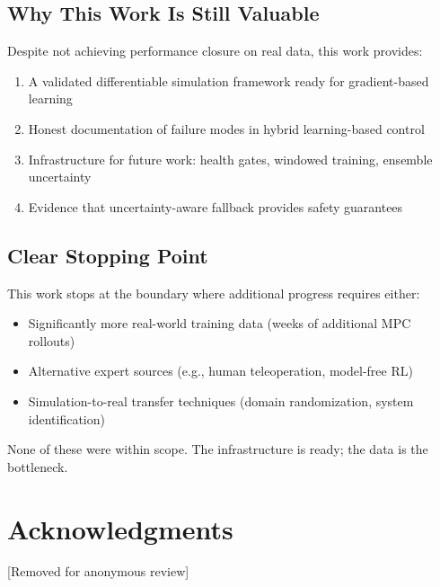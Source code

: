 \documentclass[conference]{IEEEtran}
\begin{document}
\subsection{Why This Work Is Still Valuable}

Despite not achieving performance closure on real data, this work provides:
\begin{enumerate}
\item A validated differentiable simulation framework ready for gradient-based learning
\item Honest documentation of failure modes in hybrid learning-based control
\item Infrastructure for future work: health gates, windowed training, ensemble uncertainty
\item Evidence that uncertainty-aware fallback provides safety guarantees
\end{enumerate}

\subsection{Clear Stopping Point}

This work stops at the boundary where additional progress requires either:
\begin{itemize}
\item Significantly more real-world training data (weeks of additional MPC rollouts)
\item Alternative expert sources (e.g., human teleoperation, model-free RL)
\item Simulation-to-real transfer techniques (domain randomization, system identification)
\end{itemize}

None of these were within scope. The infrastructure is ready; the data is the bottleneck.

\section*{Acknowledgments}
[Removed for anonymous review]
\end{document}
